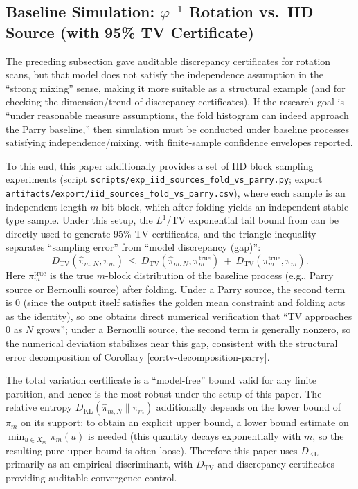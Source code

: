 \subsection{Baseline Simulation: \texorpdfstring{$\varphi^{-1}$}{phi} Rotation vs.\ IID Source (with 95\% TV Certificate)}\label{subsec:exp-iid-baselines}
The preceding subsection gave auditable discrepancy certificates for rotation scans, but that model does not satisfy the independence assumption in the ``strong mixing'' sense, making it more suitable as a structural example (and for checking the dimension/trend of discrepancy certificates). If the research goal is ``under reasonable measure assumptions, the fold histogram can indeed approach the Parry baseline,'' then simulation must be conducted under baseline processes satisfying independence/mixing, with finite-sample confidence envelopes reported.

To this end, this paper additionally provides a set of IID block sampling experiments (script \texttt{scripts/exp\_iid\_sources\_fold\_vs\_parry.py}; export \texttt{artifacts/export/iid\_sources\_fold\_vs\_parry.csv}), where each sample is an independent length-$m$ bit block, which after folding yields an independent stable type sample. Under this setup, the $L^1$/TV exponential tail bound from \cite{WeissmanEtAl2003L1Empirical} can be directly used to generate 95\% TV certificates, and the triangle inequality separates ``sampling error'' from ``model discrepancy (gap)'':
\[
D_{\mathrm{TV}}(\hat{\pi}_{m,N},\pi_m)\ \le\ D_{\mathrm{TV}}(\hat{\pi}_{m,N},\pi_m^{\mathrm{true}})\ +\ D_{\mathrm{TV}}(\pi_m^{\mathrm{true}},\pi_m).
\]
Here $\pi_m^{\mathrm{true}}$ is the true $m$-block distribution of the baseline process (e.g., Parry source or Bernoulli source) after folding. Under a Parry source, the second term is $0$ (since the output itself satisfies the golden mean constraint and folding acts as the identity), so one obtains direct numerical verification that ``TV approaches 0 as $N$ grows''; under a Bernoulli source, the second term is generally nonzero, so the numerical deviation stabilizes near this gap, consistent with the structural error decomposition of Corollary \ref{cor:tv-decomposition-parry}.




\begin{remark}
The total variation certificate is a ``model-free'' bound valid for any finite partition, and hence is the most robust under the setup of this paper. The relative entropy $D_{\mathrm{KL}}(\hat{\pi}_{m,N}\|\pi_m)$ additionally depends on the lower bound of $\pi_m$ on its support: to obtain an explicit upper bound, a lower bound estimate on $\min_{u\in X_m}\pi_m(u)$ is needed (this quantity decays exponentially with $m$, so the resulting pure upper bound is often loose). Therefore this paper uses $D_{\mathrm{KL}}$ primarily as an empirical discriminant, with $D_{\mathrm{TV}}$ and discrepancy certificates providing auditable convergence control.
\end{remark}

